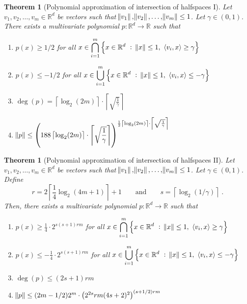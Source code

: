 \documentclass[12pt]{article}
\newtheorem{theorem}[definition]{Theorem}
\newcommand{\R}{\mathbb{R}}  %
\newcommand{\ip}[2]{\left\langle #1, #2 \right\rangle} %
\begin{document}
\begin{theorem}[Polynomial approximation of intersection of halfspaces I]
\label{theorem:polynomial-approximation-1}
Let $v_1, v_2, \dots, v_m \in \R^d$ be vectors such that $\norm{v_1},
\norm{v_2}, \dots, \norm{v_m} \le 1$. Let $\gamma \in (0,1)$. There exists a
multivariate polynomial $p:\R^d \to \R$ such that
\begin{enumerate}
\item $p(x) \ge 1/2$ for all $\displaystyle x \in \bigcap_{i=1}^m \left\{ x \in \R^d ~:~ \norm{x} \le 1, \ \ip{v_i}{x} \ge \gamma \right\}$
\item $p(x) \le -1/2$ for all $\displaystyle x \in \bigcup_{i=1}^m \left\{ x \in \R^d ~:~ \norm{x} \le 1, \ \ip{v_i}{x} \le - \gamma \right\}$
\item $\displaystyle \deg(p) = \left\lceil \log_2(2m) \right\rceil \cdot \left\lceil \sqrt{\frac{1}{\gamma}} \right\rceil$
\item $\displaystyle \norm{p} \le \left( 188 \left\lceil \log_2(2m) \right\rceil \cdot \left\lceil \sqrt{\frac{1}{\gamma}} \right\rceil \right)^{\frac{1}{2} \left\lceil \log_2(2m) \right\rceil \cdot \left\lceil \sqrt{\frac{1}{\gamma}} \right\rceil}$
\end{enumerate}
\end{theorem}

\begin{theorem}[Polynomial approximation of intersection of halfspaces II]
\label{theorem:polynomial-approximation-2}
Let $v_1, v_2, \dots, v_m \in \R^d$ be vectors such that $\norm{v_1},
\norm{v_2}, \dots, \norm{v_m} \le 1$. Let $\gamma \in (0,1)$.
Define
$$
r = 2 \left\lceil \frac{1}{4} \log_2(4m + 1) \right\rceil + 1 \qquad \text{and} \qquad s = \left \lceil \log_2(1/\gamma) \right \rceil \; .
$$
Then, there exists a multivariate polynomial $p:\R^d \to \R$ such that
\begin{enumerate}
\item $\displaystyle p(x) \ge \frac{1}{4} \cdot 2^{s(s+1)rm}$
for all $\displaystyle x \in \bigcap_{i=1}^m \left\{ x \in \R^d ~:~ \norm{x} \le 1, \ \ip{v_i}{x} \ge \gamma \right\}$

\item $\displaystyle p(x) \le - \frac{1}{4} \cdot 2^{s(s+1)rm}$
for all $\displaystyle x \in \bigcup_{i=1}^m \left\{ x \in \R^d ~:~ \norm{x} \le 1, \ \ip{v_i}{x} \le - \gamma \right\}$

\item $\deg(p) \le (2s+1) rm$
\item $\norm{p} \le (2m-1/2) 2^m \cdot \left(2^{2s} rm (4s+2)^2 \right)^{(s+1/2)rm}$
\end{enumerate}
\end{theorem}
\end{document}
